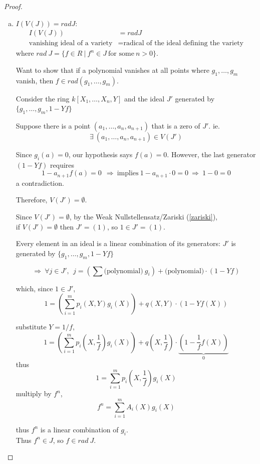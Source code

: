 \documentclass{article}
\theoremstyle{definition}
\begin{document}
\begin{proof}
\begin{enumerate}[a.]
\item $I(V(J)) = rad J$:\\
  \begin{align*}
    I(V(J)) &= rad J\\
    \text{vanishing ideal of a variety} &= \text{radical of the ideal defining the variety}
  \end{align*}
  where $rad~J = \{ f \in R ~|~ f^n \in J ~\text{for some}~ n>0 \}$.

  Want to show that if a polynomial vanishes at all points where $g_1, \ldots, g_m$ vanish, then $f \in rad(g_1, \ldots, g_m)$.

  Consider the ring $k[X_1, \ldots, X_n, Y]$ and the ideal $J'$ generated by $\{ g_1, \ldots, g_m, 1-Y f \}$

  Suppose there is a point $(a_1, \ldots, a_n, a_{n+1})$ that is a zero of $J'$. ie.
  $$\exists~ (a_1, \ldots, a_n, a_{n+1}) \in V(J')$$

  Since $g_i(a)=0$, our hypothesis says $f(a)=0$. However, the last generator $(1-Yf)$ requires
  $$1 - a_{n+1} f(a) = 0 ~~\Longrightarrow~ \text{implies}~ 1 - a_{n+1} \cdot 0 = 0 ~\Longrightarrow~ 1-0=0$$
  a contradiction.

  Therefore, $V(J') = \emptyset$.

  \vspace{0.4cm}

  Since $V(J')=\emptyset$, by the Weak Nullstellensatz/Zariski (\ref{zariski}),\\
  \hspace*{2em} if $V(J')=\emptyset$ then $J'=(1)$, so $1 \in J'=(1)$.

  Every element in an ideal is a linear combination of its generators: $J'$ is generated by $\{ g_1, \ldots, g_m, 1-Yf \}$

  $$\Longrightarrow~ \forall j \in J',~~ j=(\sum \text{(polynomial)}~ g_i) + \text{(polynomial)} \cdot (1 - Yf)$$

  which, since $1 \in J'$,
  $$1= \left( \sum_{i=1}^m p_i(X,Y) g_i(X) \right) + q(X,Y) \cdot (1 - Y f(X))$$

  substitute $Y=1/f$,
  $$1= \left( \sum_{i=1}^m p_i(X,\frac{1}{f}) g_i(X) \right) + q(X,\frac{1}{f}) \cdot \underbrace{(1 - \frac{1}{f} f(X))}_{0}$$
  thus
  $$1= \sum_{i=1}^m p_i(X,\frac{1}{f}) g_i(X)$$
  multiply by $f^n$,
  $$f^n= \sum_{i=1}^m A_i(X) g_i(X)$$

  thus $f^n$ is a linear combination of $g_i$.\\
  Thus $f^n \in J$, so $f \in rad~J$.
\end{enumerate}
\end{proof}
\end{document}
